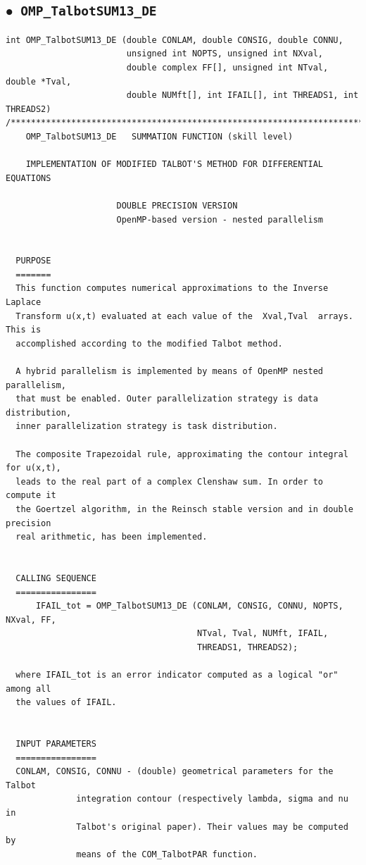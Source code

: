 \documentclass[a4paper,10pt]{report}%
\begin{document}
\subsection{\texorpdfstring{$\boldsymbol{\bullet}$}{ - }{\tt\ OMP\_TalbotSUM13\_DE}}
\begin{lstlisting}
int OMP_TalbotSUM13_DE (double CONLAM, double CONSIG, double CONNU,
                        unsigned int NOPTS, unsigned int NXval,
                        double complex FF[], unsigned int NTval, double *Tval,
                        double NUMft[], int IFAIL[], int THREADS1, int THREADS2)
/*****************************************************************************
    OMP_TalbotSUM13_DE   SUMMATION FUNCTION (skill level)

    IMPLEMENTATION OF MODIFIED TALBOT'S METHOD FOR DIFFERENTIAL EQUATIONS

                      DOUBLE PRECISION VERSION
                      OpenMP-based version - nested parallelism


  PURPOSE
  =======
  This function computes numerical approximations to the Inverse Laplace
  Transform u(x,t) evaluated at each value of the  Xval,Tval  arrays. This is
  accomplished according to the modified Talbot method.

  A hybrid parallelism is implemented by means of OpenMP nested parallelism,
  that must be enabled. Outer parallelization strategy is data distribution,
  inner parallelization strategy is task distribution.

  The composite Trapezoidal rule, approximating the contour integral for u(x,t),
  leads to the real part of a complex Clenshaw sum. In order to compute it
  the Goertzel algorithm, in the Reinsch stable version and in double precision
  real arithmetic, has been implemented.


  CALLING SEQUENCE
  ================
      IFAIL_tot = OMP_TalbotSUM13_DE (CONLAM, CONSIG, CONNU, NOPTS, NXval, FF,
                                      NTval, Tval, NUMft, IFAIL,
                                      THREADS1, THREADS2);

  where IFAIL_tot is an error indicator computed as a logical "or" among all
  the values of IFAIL.


  INPUT PARAMETERS
  ================
  CONLAM, CONSIG, CONNU - (double) geometrical parameters for the Talbot
              integration contour (respectively lambda, sigma and nu in
              Talbot's original paper). Their values may be computed by
              means of the COM_TalbotPAR function.


\end{lstlisting}
\end{document}
